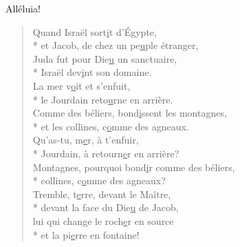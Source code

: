 Alléluia! \\

\begin{verse}
Quand Israël sort\underline{i}t d’Égypte, \\*
et Jacob, de chez un pe\underline{u}ple étranger, \\
Juda fut pour Die\underline{u} un sanctuaire, \\*
Israël dev\underline{i}nt son domaine. \\

La mer v\underline{o}it et s’enfuit, \\*
le Jourdain reto\underline{u}rne en arrière. \\
Comme des béliers, bond\underline{i}ssent les montagnes, \\*
et les collines, c\underline{o}mme des agneaux. \\

Qu’as-tu, m\underline{e}r, à t’enfuir, \\*
Jourdain, à retourn\underline{e}r en arrière? \\
Montagnes, pourquoi bond\underline{i}r comme des béliers, \\*
collines, c\underline{o}mme des agneaux? \\

Tremble, t\underline{e}rre, devant le Maître, \\*
devant la face du Die\underline{u} de Jacob, \\
lui qui change le roch\underline{e}r en source \\*
et la pi\underline{e}rre en fontaine! \\
\end{verse}

